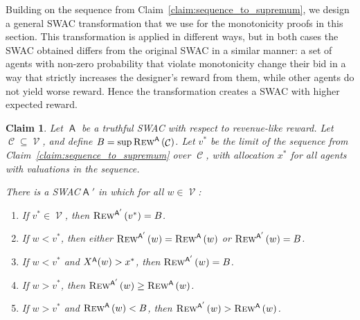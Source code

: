 \documentclass[11pt,letterpaper]{article}
\newcommand{\swac}{SWAC\xspace}
\DeclareMathOperator{\A}{\auc{A}}
\DeclareMathOperator{\C}{\mathcal{C}}
\DeclareMathOperator{\V}{\mathcal{V}}
\newcommand{\vstar}{{v^*}}
\newcommand{\xstar}{{x^*}}
\theoremstyle{plain}
\newtheorem{claim}{Claim}
\newcommand{\auc}[1]{\mathsf{#1}}
\begin{document}
Building on the sequence from Claim~\ref{claim:sequence_to_supremum}, we design a general \swac transformation that we use for the monotonicity proofs in this section.
This transformation is applied in different ways, but in both cases the \swac obtained differs from the original \swac in a similar manner: a set of agents with non-zero probability that violate monotonicity change their bid in a way that
strictly increases the designer's reward from them,
while other agents do not yield worse reward. Hence the transformation creates 
a \swac with higher expected reward.


\begin{claim}\label{claim:rev_create_a_tag}
     Let $\A$ be a truthful \swac with respect to revenue-like reward.
     Let $\C\subseteq\V$, and define $B=\sup \trew[\A]{\C}$. Let $\vstar$ be the limit of the sequence from Claim~\ref{claim:sequence_to_supremum} over $\C$, with allocation $\xstar$ for all agents with valuations in the sequence.

     There is a \swac $\A'$ in which for all $w\in\V$:  
     \begin{enumerate}
         \item If $\vstar\in\V$, then $\trew[\A']{\vstar}= B$.\label{item:1_rev_create_a_tag}
         \item If $w<\vstar$, then either $\trew[\A']{w}=\trew[\A]{w}$ or $\trew[\A']{w}=B$.\label{item:2_rev_create_a_tag}
         \item If $w<\vstar$ and $\x[\A]{w}> \xstar$, then $\trew[\A']{w}=B$.\label{item:3_rev_create_a_tag}
         \item If $w>\vstar$, then $\trew[\A']{w}\geq \trew[\A]{w}$.\label{item:4_rev_create_a_tag}
         \item If $w>\vstar$ and $\trew[\A]{w}<B$, then $\trew[\A']{w}>\trew[\A]{w}$.\label{item:5_rev_create_a_tag}
     \end{enumerate}
\end{claim}
\end{document}
